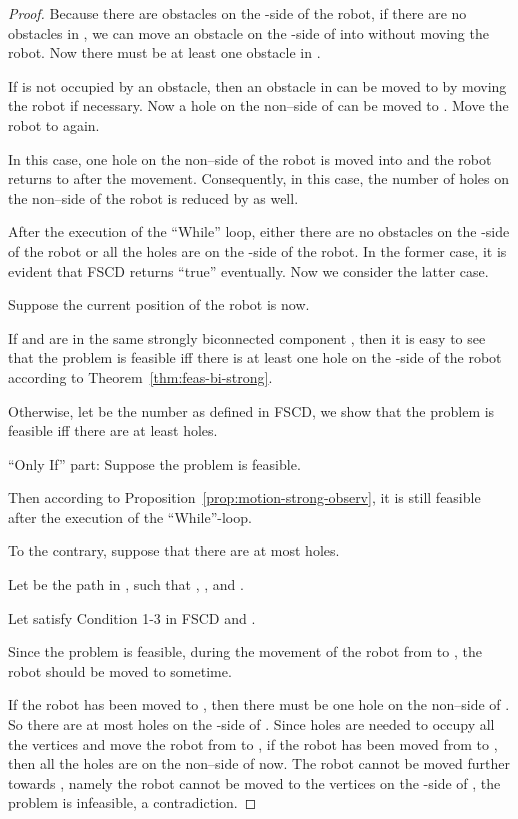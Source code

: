 \documentclass{article}
\begin{document}
\begin{proof}
Because there are obstacles on the -side of the robot, if there
are no obstacles in , we can move an obstacle on the -side of
 into  without moving the robot. Now there must be at least
one obstacle in .

If  is not occupied by an obstacle, then an obstacle in  can
be moved to  by moving the robot if necessary. Now a hole on the
non--side of  can be moved to . Move the robot to 
again.

In this case, one hole on the non--side of the robot is moved
into  and the robot returns to  after the movement.
Consequently, in this case, the number of holes on the non--side
of the robot is reduced by  as well.

\medskip

\noindent After the execution of the ``While'' loop, either there
are no obstacles on the -side of the robot or all the holes are
on the -side of the robot. In the former case, it is evident that
FSCD returns ``true'' eventually. Now we consider the latter case.

Suppose the current position of the robot is  now.

If  and  are in the same strongly biconnected component
, then it is easy to see that the problem is feasible iff there
is at least one hole on the -side of the robot according to
Theorem~\ref{thm:feas-bi-strong}.

Otherwise, let  be the number as defined in FSCD, we show that
the problem is feasible iff there are at least  holes.

``Only If'' part: Suppose the problem is feasible.

Then according to Proposition~\ref{prop:motion-strong-observ}, it is
still feasible after the execution of the ``While''-loop.

To the contrary, suppose that there are at most  holes.

Let  be the path in
, such that
, ,  and .

Let  satisfy Condition 1-3 in FSCD and
.

Since the problem is feasible, during the movement of the robot from
 to , the robot should be moved to  sometime.

If the robot has been moved to , then there must be one hole on
the non--side of . So there are at most  holes on the
-side of . Since  holes are needed to occupy all the
vertices  and move the robot from  to
, if the robot has been moved from  to , then all the
holes are on the non--side of  now. The robot cannot be
moved further towards , namely the robot cannot be moved to the
vertices on the -side of , the problem is infeasible, a
contradiction.


\end{proof}
\end{document}
